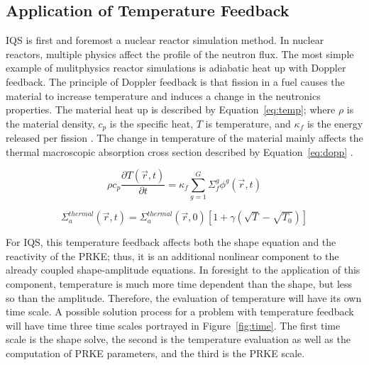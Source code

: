 \documentclass[12pt]{scrartcl}
\newcommand{\eqt}[1]{Equation~\ref{#1}}                     %
\newcommand{\fig}[1]{Figure~\ref{#1}}                      %
\newcommand{\be}{\begin{equation}}
\newcommand{\ee}{\end{equation}}
\begin{document}
\subsection{Application of Temperature Feedback}

IQS is first and foremost a nuclear reactor simulation method.  In nuclear reactors, multiple physics affect the profile of the neutron flux.  The most simple example of mulitphysics reactor simulations is adiabatic heat up with Doppler feedback. The principle of Doppler feedback is that fission in a fuel causes the material to increase temperature and induces a change in the neutronics properties.  The material heat up is described by \eqt{eq:temp}; where $\rho$ is the material density, $c_p$ is the specific heat, $T$ is temperature, and $\kappa_f$ is the energy released per fission \cite{ANL_BPB}. The change in temperature of the material mainly affects the thermal macroscopic absorption cross section described by \eqt{eq:dopp} \cite{ANL_BPB}.

\be
\rho c_p \frac{\partial T(\vec{r},t)}{\partial t} = \kappa_f \sum^G_{g=1}\Sigma_f^g \phi^g(\vec{r},t)
\label{eq:temp}
\ee

\be
\Sigma_a^{thermal}(\vec{r},t) = \Sigma_a^{thermal}(\vec{r},0)\left[1+\gamma\left(\sqrt{T}-\sqrt{T_0}\right)\right]
\label{eq:dopp}
\ee

For IQS, this temperature feedback affects both the shape equation and the reactivity of the PRKE; thus, it is an additional nonlinear component to the already coupled shape-amplitude equations. In foresight to the application of this component, temperature is much more time dependent than the shape, but less so than the amplitude.  Therefore, the evaluation of temperature will have its own time scale.  A possible solution process for a problem with temperature feedback will have time three time scales portrayed in \fig{fig:time}.  The first time scale is the shape solve, the second is the temperature evaluation as well as the computation of PRKE parameters, and the third is the PRKE scale.
\end{document}
